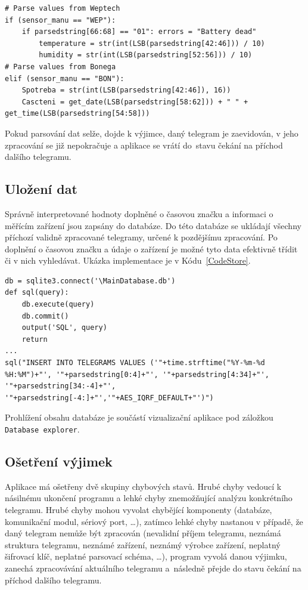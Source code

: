 \begin{lstlisting}[caption={Ukázka parsování dat},captionpos=b,label=CodeParse,style=MyCodePython]
# Parse values from Weptech
if (sensor_manu == "WEP"):
	if parsedstring[66:68] == "01": errors = "Battery dead"
		temperature = str(int(LSB(parsedstring[42:46])) / 10)
		humidity = str(int(LSB(parsedstring[52:56])) / 10)
# Parse values from Bonega       
elif (sensor_manu == "BON"):
	Spotreba = str(int(LSB(parsedstring[42:46]), 16))
	Cascteni = get_date(LSB(parsedstring[58:62])) + " " + get_time(LSB(parsedstring[54:58]))
\end{lstlisting}
Pokud parsování dat selže, dojde k výjimce, daný telegram je zaevidován, v jeho zpracování se již nepokračuje a aplikace se vrátí do~stavu čekání na příchod dalšího telegramu.

\subsection{Uložení dat}
\label{SectionUlozeniDatabaze2}
Správně interpretované hodnoty doplněné o časovou značku a informaci o měřícím zařízení jsou zapsány do databáze. Do této databáze se ukládají všechny příchozí validně zpracované telegramy, určené k pozdějšímu zpracování. Po doplnění o časovou značku a údaje o zařízení je možné tyto data efektivně třídit či v nich vyhledávat. Ukázka implementace je v Kódu~\ref{CodeStore}.

\vspace{10pt}

\begin{lstlisting}[caption={Ukázka ukládání dat},captionpos=b,label=CodeStore,style=MyCodePython]
db = sqlite3.connect('\MainDatabase.db')
def sql(query):
    db.execute(query)
    db.commit()
    output('SQL', query)
    return
...
sql("INSERT INTO TELEGRAMS VALUES ('"+time.strftime("%Y-%m-%d %H:%M")+"', '"+parsedstring[0:4]+"', '"+parsedstring[4:34]+"', '"+parsedstring[34:-4]+"', '"+parsedstring[-4:]+"','"+AES_IQRF_DEFAULT+"')")		
\end{lstlisting}

Prohlížení obsahu databáze je součástí vizualizační aplikace pod záložkou \texttt{Database explorer}.


\subsection{Ošetření výjimek}
\label{SectionUlozeniLogu}
Aplikace má ošetřeny dvě skupiny chybových stavů. Hrubé chyby vedoucí k násilnému ukončení programu a lehké chyby znemožňující analýzu konkrétního telegramu. Hrubé chyby mohou vyvolat chybějící komponenty (databáze, komunikační modul, sériový port, \ldots), zatímco lehké chyby nastanou v případě, že daný telegram nemůže být zpracován (nevalidní příjem telegramu, neznámá struktura telegramu, neznámé zařízení, neznámý výrobce zařízení, neplatný šifrovací klíč, neplatné parsovací schéma, \ldots ), program vyvolá danou výjimku, zanechá zpracovávání aktuálního telegramu a~následně přejde do stavu čekání na příchod dalšího telegramu.

